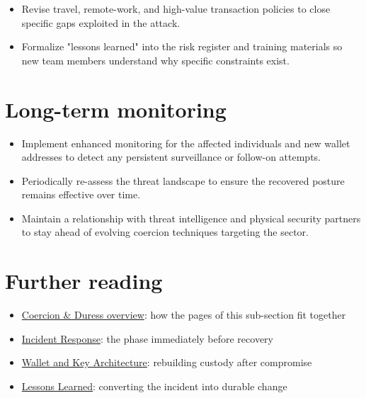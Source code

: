 \begin{itemize}
\tightlist
\item
  Revise travel, remote-work, and high-value transaction policies to close specific gaps exploited in the attack.
\item
  Formalize "lessons learned" into the risk register and training materials so new team members understand why specific constraints exist.
\end{itemize}

\section{Long-term monitoring}\label{long-term-monitoring}

\begin{itemize}
\tightlist
\item
  Implement enhanced monitoring for the affected individuals and new wallet addresses to detect any persistent surveillance or follow-on attempts.
\item
  Periodically re-assess the threat landscape to ensure the recovered posture remains effective over time.
\item
  Maintain a relationship with threat intelligence and physical security partners to stay ahead of evolving coercion techniques targeting the sector.
\end{itemize}

\section{Further reading}\label{further-reading-10}

\begin{itemize}
\tightlist
\item
  \href{https://frameworks.securityalliance.dev/physical-security/coercion-and-duress/overview}{Coercion \& Duress overview}: how the pages of this sub-section fit together
\item
  \href{https://frameworks.securityalliance.dev/physical-security/coercion-and-duress/incident-response}{Incident Response}: the phase immediately before recovery
\item
  \href{https://frameworks.securityalliance.dev/physical-security/coercion-and-duress/wallet-and-key-architecture}{Wallet and Key Architecture}: rebuilding custody after compromise
\item
  \href{https://frameworks.securityalliance.dev/incident-management/lessons-learned}{Lessons Learned}: converting the incident into durable change
\end{itemize}

